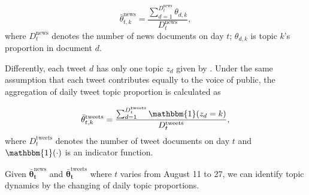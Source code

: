 \begin{equation}
\bar{\theta}_{t,k}^{\mathrm{news}}=\frac{\sum_{d=1}^{D_t^{\mathrm{news}}} \theta_{d,k}}{D_t^{\mathrm{news}}},
\end{equation}
where $D_t^{\mathrm{news}}$ denotes the number of news documents on day $t$; $\theta_{d,k}$ is topic $k$'s proportion in document $d$.

Differently, each tweet $d$ has only one topic $z_d$ given by \stlda. Under the same assumption that each tweet contributes equally to the voice of public, the aggregation of daily tweet topic proportion is calculated as

\begin{equation}
\bar{\theta}_{t,k}^{\mathrm{tweets}} = \frac{\sum_{d=1}^{D_t^{\mathrm{tweets}}} \mathbbm{1}(z_d=k)}{D_t^{\mathrm{tweets}}},
\end{equation}
where $D_t^{\mathrm{tweets}}$ denotes the number of tweet documents on day $t$ and $\mathbbm{1}(\cdot)$ is an indicator function.

Given $\bm{\bar{\theta}_t^{\mathrm{news}}}$ and $\bm{\bar{\theta}_t^{\mathrm{tweets}}}$ where $t$ varies from August 11 to 27, we can identify topic dynamics by the changing of daily topic proportions. 